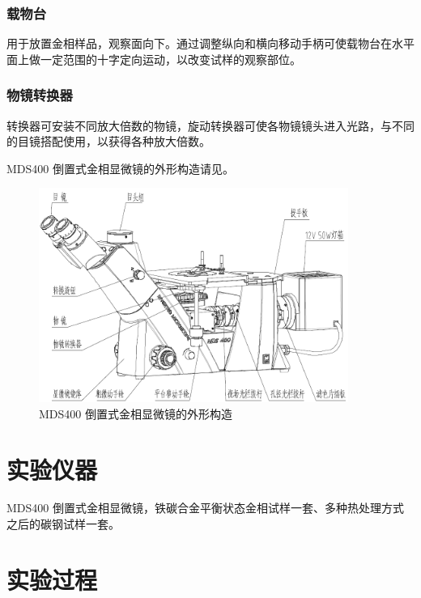 \documentclass[a4paper,utf8]{article}
\begin{document}
        \subsubsection{载物台}
            用于放置金相样品，观察面向下。通过调整纵向和横向移动手柄可使载物台在水平面上做一定范围的十字定向运动，以改变试样的观察部位。
        \subsubsection{物镜转换器}
            转换器可安装不同放大倍数的物镜，旋动转换器可使各物镜镜头进入光路，与不同的目镜搭配使用，以获得各种放大倍数。
        \par
        MDS400 倒置式金相显微镜的外形构造请见。
        \begin{figure}[!ht]
            \caption{MDS400 倒置式金相显微镜的外形构造\label{fig:MDS400}}
            \includegraphics[width=0.9\textwidth]{MDS400.png}
        \end{figure}
\section{实验仪器}%
    MDS400 倒置式金相显微镜，铁碳合金平衡状态金相试样一套、多种热处理方式之后的碳钢试样一套。
\section{实验过程}%
\end{document}
